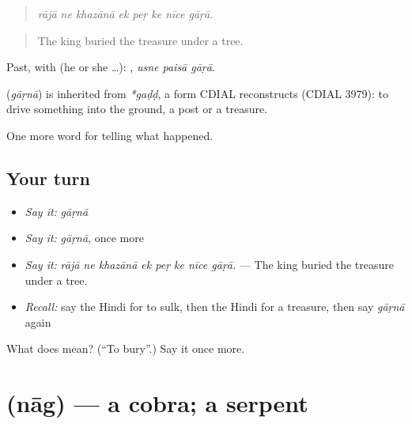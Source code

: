 \begin{quote}
       
\end{quote}

\begin{quote}
\emph{rājā ne khazānā ek peṛ ke nīce gāṛā.}
\end{quote}

\begin{quote}
The king buried the treasure under a tree.
\end{quote}

Past, with  (he or she …):   , \emph{usne paisā gāṛā}.

\begin{cousinweb}
\textbf{} (\emph{gāṛnā}) is inherited from \emph{*gaḍḍ}, a form CDIAL reconstructs (CDIAL 3979): to drive something into the ground, a post or a treasure.
\end{cousinweb}

\begin{grammarlens}[title={What you've built}]
One more word for telling what happened.
\end{grammarlens}

\subsection*{Your turn}
\begin{itemize}
\raggedright
  \item \emph{Say it:} \emph{gāṛnā}
  \item \emph{Say it:} \emph{gāṛnā}, once more
  \item \emph{Say it:} \emph{rājā ne khazānā ek peṛ ke nīce gāṛā.} — The king buried the treasure under a tree.
  \item \emph{Recall:} say the Hindi for to sulk, then the Hindi for a treasure, then say \emph{gāṛnā} again
\end{itemize}

\begin{tcolorbox}[breakable,colback=teal!4,colframe=teal!35!black,title={Before you move on}]
What does  mean? (\textquotedblleft{}To bury\textquotedblright{}.) Say it once more.
\end{tcolorbox}
\section[\texorpdfstring{\hi{नाग} (nāg)}{नाग (nāg)}]{ (nāg) — a cobra; a serpent}

